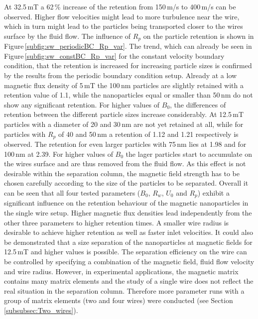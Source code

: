 At 32.5\,mT a 62\,\% increase of the retention from 150\,\textmu m/s to 400\,\textmu m/s can be observed. Higher flow velocities might lead to more turbulence near the wire, which in turn might lead to the particles being transported closer to the wires surface by the fluid flow. The influence of $R_{p}$ on the particle retention is shown in Figure\,\ref{subfig:sw_periodicBC_Rp_var}. The trend, which can already be seen in Figure\,\ref{subfig:sw_constBC_Rp_var} for the constant velocity boundary condition, that the retention is increased for increasing particle sizes is confirmed by the results from the periodic boundary condition setup. Already at a low magnetic flux density of 5\,mT the 100\,nm particles are slightly retained with a retention value of 1.1, while the nanoparticles equal or smaller than 50\,nm do not show any significant retention. For higher values of $B_{0}$, the differences of retention between the different particle sizes increase considerably. At 12.5\,mT particles with a diameter of 20 and 30\,nm are not yet retained at all, while for particles with $R_{p}$ of 40 and 50\,nm a retention of 1.12 and 1.21 respectively is observed. The retention for even larger particles with 75\,nm lies at 1.98 and for 100\,nm at 2.39. For higher values of $B_{0}$ the lager particles start to accumulate on the wires surface and are thus removed from the fluid flow. As this effect is not desirable within the separation column, the magnetic field strength has to be chosen carefully according to the size of the particles to be separated.
Overall it can be seen that all four tested parameters ($B_{0}$, $R_{w}$, $U_{0}$ and $R_{p}$) exhibit a significant influence on the retention behaviour of the magnetic nanoparticles in the single wire setup. Higher magnetic flux densities lead independently from the other three parameters to higher retention times. A smaller wire radius is desirable to achieve higher retention as well as faster inlet velocities. It could also be demonstrated that a size separation of the nanoparticles at magnetic fields for 12.5\,mT and higher values is possible. The separation efficiency on the wire can be controlled by specifying a combination of the magnetic field, fluid flow velocity and wire radius. However, in experimental applications, the magnetic matrix contains many matrix elements and the study of a single wire does not reflect the real situation in the separation column. Therefore more parameter runs with a group of matrix elements (two and four wires) were conducted (see Section\,\ref{subsubsec:Two_wires}).   

